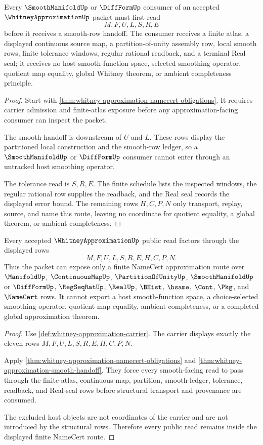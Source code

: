 \begin{theorem}
\label{thm:whitney-approximation-smooth-handoff}
Every $\SmoothManifoldUp$ or $\DiffFormUp$ consumer of an accepted $\WhitneyApproximationUp$ packet must first read
$$
M,F,U,L,S,R,E
$$
before it receives a smooth-row handoff. The consumer receives a finite atlas, a displayed continuous source map, a partition-of-unity assembly row, local smooth rows, finite tolerance windows, regular rational readback, and a terminal Real seal; it receives no host smooth-function space, selected smoothing operator, quotient map equality, global Whitney theorem, or ambient completeness principle.
\end{theorem}
\begin{proof}
Start with \autoref{thm:whitney-approximation-namecert-obligations}. It requires carrier admission and finite-atlas exposure before any approximation-facing consumer can inspect the packet.

The smooth handoff is downstream of $U$ and $L$. These rows display the partitioned local construction and the smooth-row ledger, so a $\SmoothManifoldUp$ or $\DiffFormUp$ consumer cannot enter through an untracked host smoothing operator.

The tolerance read is $S,R,E$. The finite schedule lists the inspected windows, the regular rational row supplies the readback, and the Real seal records the displayed error bound. The remaining rows $H,C,P,N$ only transport, replay, source, and name this route, leaving no coordinate for quotient equality, a global theorem, or ambient completeness.
\end{proof}

\begin{theorem}
\label{thm:whitney-approximation-nonescape}
Every accepted $\WhitneyApproximationUp$ public read factors through the displayed rows
$$
M,F,U,L,S,R,E,H,C,P,N.
$$
Thus the packet can expose only a finite NameCert approximation route over $\ManifoldUp$, $\ContinuousMapUp$, $\PartitionOfUnityUp$, $\SmoothManifoldUp$ or $\DiffFormUp$, $\RegSeqRatUp$, $\RealUp$, $\BHist$, $\hsame$, $\Cont$, $\Pkg$, and $\NameCert$ rows. It cannot export a host smooth-function space, a choice-selected smoothing operator, quotient map equality, ambient completeness, or a completed global approximation theorem.
\end{theorem}
\begin{proof}
Use \autoref{def:whitney-approximation-carrier}. The carrier displays exactly the eleven rows $M,F,U,L,S,R,E,H,C,P,N$.

Apply \autoref{thm:whitney-approximation-namecert-obligations} and \autoref{thm:whitney-approximation-smooth-handoff}. They force every smooth-facing read to pass through the finite-atlas, continuous-map, partition, smooth-ledger, tolerance, readback, and Real-seal rows before structural transport and provenance are consumed.

The excluded host objects are not coordinates of the carrier and are not introduced by the structural rows. Therefore every public read remains inside the displayed finite NameCert route.
\end{proof}

